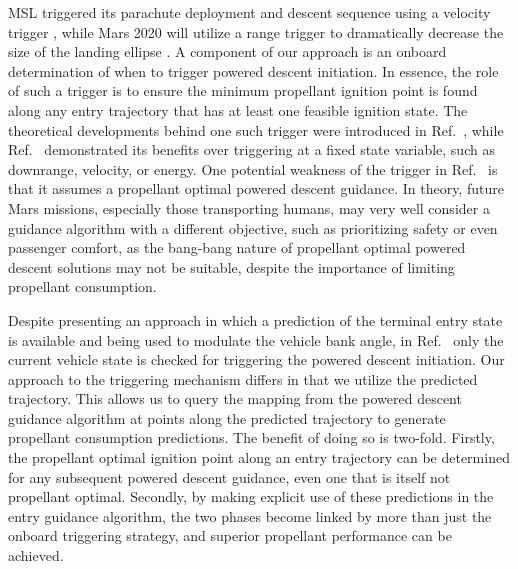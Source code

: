 \documentclass[letterpaper, paper,11pt]{AAS}
\begin{document}
MSL triggered its parachute deployment and descent sequence using a velocity trigger \cite{MSL_EDL}, while Mars 2020 will utilize a range trigger \cite{M2020_EDL} to dramatically decrease the size of the landing ellipse \cite{TriggerComparison2020}. A component of our approach is an onboard determination of when to trigger powered descent initiation.  In essence, the role of such a trigger is to ensure the minimum propellant ignition point is found along any entry trajectory that has at least one feasible ignition state. The theoretical developments behind one such trigger were introduced in Ref.~\cite{PropellantOptimalAdaptiveTrigger}, while Ref.~\cite{LuAdaptiveEDL} demonstrated its benefits over triggering at a fixed state variable, such as downrange, velocity, or energy.
One potential weakness of the trigger in Ref.~\cite{PropellantOptimalAdaptiveTrigger} is that it assumes a propellant optimal powered descent guidance. In theory, future Mars missions, especially those transporting humans, may very well consider a guidance algorithm with a different objective, such as prioritizing safety or even passenger comfort, as the bang-bang nature of propellant optimal powered descent solutions may not be suitable, despite the importance of limiting propellant consumption. 

Despite presenting an approach in which a prediction of the terminal entry state is available and being used to modulate the vehicle bank angle, in Ref.~\cite{LuAdaptiveEDL} only the current vehicle state is checked for triggering the powered descent initiation. Our approach to the triggering mechanism differs in that we utilize the predicted trajectory. This allows us to query the mapping from the powered descent guidance algorithm at points along the predicted trajectory to generate propellant consumption predictions.  The benefit of doing so is two-fold. Firstly, the propellant optimal ignition point along an entry trajectory can be determined for any subsequent powered descent guidance, even one that is itself not propellant optimal. Secondly, by making explicit use of these predictions in the entry guidance algorithm, the two phases become linked by more than just the onboard triggering strategy, and superior propellant performance can be achieved. 

\end{document}
